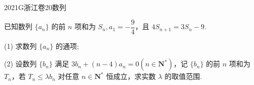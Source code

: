 
\begin{problem}{2021}{G}{浙江卷}{20}{数列}

已知数列 $\{a_n\}$ 的前 $n$ 项和为 $S_n, a_1=-\dfrac{9}{4}$，且 $4S_{n+1}=3S_n-9$.

(1) 求数列 $\{a_n\}$ 的通项;

(2) 设数列 $\{b_n\}$ 满足 $3b_n+(n-4)a_n=0(n\in \mathbf{N}^*)$，记 $\{b_n\}$ 的前 $n$ 项和为 $T_n$，若 $T_n \leqslant \lambda b_n$ 对任意 $n\in \mathbf{N}^*$ 恒成立，求实数 $\lambda$ 的取值范围.

\end{problem}